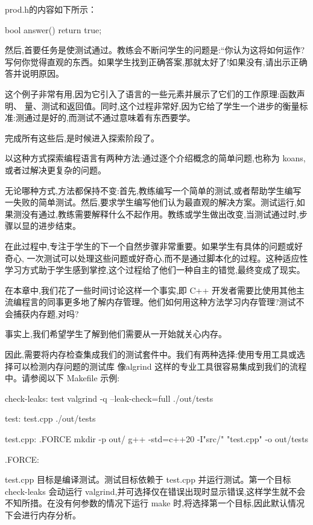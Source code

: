 prod.h的内容如下所示：

\begin{cpp}
bool answer(){
  return true;
}
\end{cpp}

然后,首要任务是使测试通过。教练会不断问学生的问题是:“你认为这将如何运作?写何你觉得直观的东西。如果学生找到正确答案,那就太好了!如果没有,请出示正确答并说明原因。

这个例子非常有用,因为它引入了语言的一些元素并展示了它们的工作原理:函数声明、 量、测试和返回值。同时,这个过程非常好,因为它给了学生一个进步的衡量标准:测通过是好的,而测试不通过意味着有东西要学。

完成所有这些后,是时候进入探索阶段了。


以这种方式探索编程语言有两种方法:通过逐个介绍概念的简单问题,也称为 koans,或者过解决更复杂的问题。

无论哪种方式,方法都保持不变:首先,教练编写一个简单的测试,或者帮助学生编写一失败的简单测试。然后,要求学生编写他们认为最直观的解决方案。测试运行,如果测没有通过,教练需要解释什么不起作用。教练或学生做出改变,当测试通过时,步骤以显的进步结束。

在此过程中,专注于学生的下一个自然步骤非常重要。如果学生有具体的问题或好奇心, 一次测试可以处理这些问题或好奇心,而不是通过脚本化的过程。这种适应性学习方式助于学生感到掌控,这个过程给了他们一种自主的错觉,最终变成了现实。


在本章中,我们花了一些时间讨论这样一个事实,即 C++ 开发者需要比使用其他主流编程言的同事更多地了解内存管理。他们如何用这种方法学习内存管理?测试不会捕获内存题,对吗? 

事实上,我们希望学生了解到他们需要从一开始就关心内存。 

因此,需要将内存检查集成我们的测试套件中。我们有两种选择:使用专用工具或选择可以检测内存问题的测试库 像algrind 这样的专业工具很容易集成到我们的流程中。请参阅以下 Makefile 示例:

\begin{shell}
check-leaks: test
  valgrind -q --leak-check=full ./out/tests

test: test.cpp
  ./out/tests

test.cpp: .FORCE
  mkdir -p out/
  g++ -std=c++20 -I"src/" "test.cpp" -o out/tests

.FORCE:
\end{shell}

test.cpp 目标是编译测试。测试目标依赖于 test.cpp 并运行测试。第一个目标 check-leaks 会动运行 valgrind,并可选择仅在错误出现时显示错误,这样学生就不会不知所措。在没有何参数的情况下运行 make 时,将选择第一个目标,因此默认情况下会进行内存分析。

